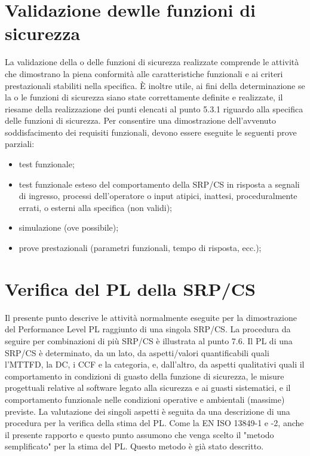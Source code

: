 \section{Validazione dewlle funzioni di sicurezza}
\label{subsec:07-3}
La validazione della o delle funzioni di sicurezza realizzate comprende le attività che dimostrano la piena conformità alle caratteristiche funzionali e ai criteri prestazionali stabiliti nella specifica. È inoltre utile, ai fini della determinazione se la o le funzioni di sicurezza siano state correttamente definite e realizzate, il riesame della realizzazione dei punti elencati al punto 5.3.1 riguardo alla specifica delle funzioni di sicurezza.
Per consentire una dimostrazione dell'avvenuto soddisfacimento dei requisiti funzionali, devono essere eseguite le seguenti prove parziali:
\begin{itemize}
    \item test funzionale;
    \item test funzionale esteso del comportamento della SRP/CS in risposta a segnali di ingresso, processi dell'operatore o input atipici, inattesi, proceduralmente errati, o esterni alla specifica (non validi);
    \item simulazione (ove possibile);
    \item prove prestazionali (parametri funzionali, tempo di risposta, ecc.);
\end{itemize}

\section{Verifica del PL della SRP/CS}
\label{subsec:07-4}
Il presente punto descrive le attività normalmente eseguite per la dimostrazione del Performance Level PL raggiunto di una singola SRP/CS. La procedura da seguire per combinazioni di più SRP/CS è illustrata al punto 7.6.
Il PL di una SRP/CS è determinato, da un lato, da aspetti/valori quantificabili quali l'MTTFD, la DC, i CCF e la categoria, e, dall'altro, da aspetti qualitativi quali il comportamento in condizioni di guasto della funzione di sicurezza, le misure progettuali relative al software legato alla sicurezza e ai guasti sistematici, e il comportamento funzionale nelle condizioni operative e ambientali (massime) previste. La valutazione dei singoli aspetti è seguita da una descrizione di una procedura per la verifica della stima del PL. Come la EN ISO 13849-1 e -2, anche il presente rapporto e questo punto assumono che venga scelto il "metodo semplificato" per la stima del PL. Questo metodo è già stato descritto.

